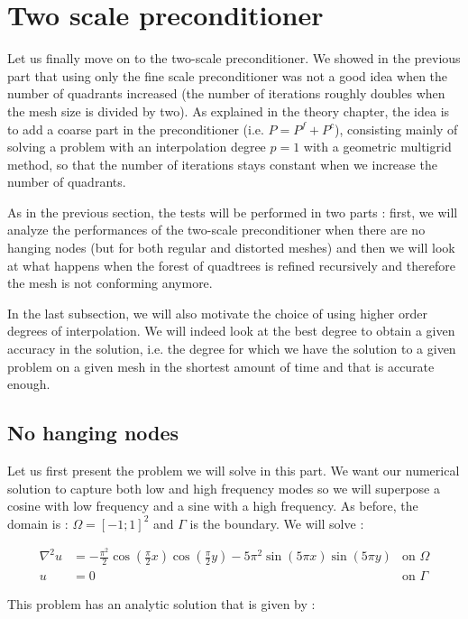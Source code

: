 \section{Two scale preconditioner}

Let us finally move on to the two-scale preconditioner. We showed in the previous part that using only the fine scale preconditioner was not a good idea when the number of quadrants increased (the number of iterations roughly doubles when the mesh size is divided by two). As explained in the theory chapter, the idea is to add a coarse part in the preconditioner (i.e. $P = P^f + P^c$), consisting mainly of solving a problem with an interpolation degree $p=1$ with a geometric multigrid method, so that the number of iterations stays constant when we increase the number of quadrants.  

As in the previous section, the tests will be performed in two parts : first, we will analyze the performances of the two-scale preconditioner when there are no hanging nodes (but for both regular and distorted meshes) and then we will look at what happens when the forest of quadtrees is refined recursively and therefore the mesh is not conforming anymore. 

In the last subsection, we will also motivate the choice of using higher order degrees of interpolation. We will indeed look at the best degree to obtain a given accuracy in the solution, i.e. the degree for which we have the solution to a given problem on a given mesh in the shortest amount of time and that is accurate enough. 

\subsection{No hanging nodes}

Let us first present the problem we will solve in this part. We want our numerical solution to capture both low and high frequency modes so we will superpose a cosine with low frequency and a sine with a high frequency. As before, the domain is : $\Omega = \left[ -1;1 \right]^2$ and $\Gamma$ is the boundary. We will solve : 

\begin{align}
\nabla^2 u &= -\frac{\pi^2}{2}\cos(\frac{\pi}{2}x)\cos(\frac{\pi}{2}y) - 5\pi^2\sin(5\pi x)\sin(5\pi y) &\text{on $\Omega$} \label{eq:prob_two}\\
u &= 0  &\text{on $\Gamma$}
\end{align}

This problem has an analytic solution that is given by : 


